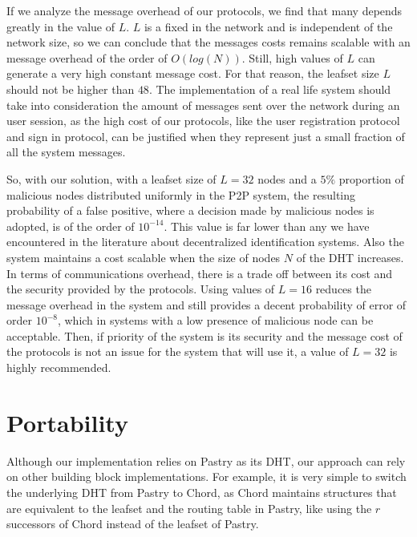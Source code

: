 If we analyze the message overhead of our protocols, we find that many depends
greatly in the value of $L$. $L$ is a fixed in the network and is
independent of the network size, so we can conclude that the messages costs
remains scalable with an message overhead of the order of $O(log(N))$.
 Still, high values of $L$ can generate a very high constant message cost. For that reason, the leafset size
$L$ should not be higher than $48$.  The implementation of a real life system
should take into consideration the amount of messages sent over the network
during an user session, as the high cost of our protocols, like the user
registration protocol and sign in protocol, can be justified when they represent just a
small fraction of all the system messages.

So, with our solution, with a leafset size of $L = 32$ nodes and a
$5\%$ proportion of malicious nodes distributed uniformly in the P2P system, the resulting probability of a false
positive, where a decision made by malicious nodes is adopted, is of the order
of $10^{-14}$. 
This value is far lower than any we have encountered in the
literature about decentralized identification systems. Also the system
maintains a cost scalable when the size of nodes $N$ of the DHT
increases. In terms of communications overhead, there is a trade off between its
cost and the security provided by the protocols. Using values of
$L = 16$ reduces the message overhead in the system and still provides a decent
probability of error of order $10^{-8}$, which in systems with a low presence of
malicious node can be acceptable. Then, if priority of the system is its
security and the message cost of the protocols is not
an issue for the system that will use it, a value of $L = 32$ is highly recommended. 


\section{Portability}

Although our implementation relies on Pastry as its DHT, our approach can rely
on other building block implementations. For example, it is very simple to
switch the underlying DHT from Pastry to Chord, as Chord maintains structures
that are equivalent to the leafset and the routing table in Pastry, like using
the $r$ successors of Chord instead of the leafset of Pastry.

